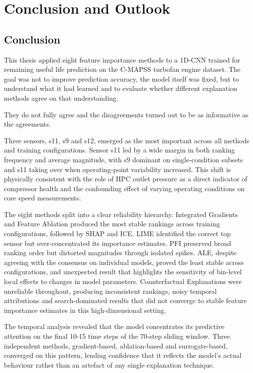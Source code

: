 \cleardoublepage

\chapter{Conclusion and Outlook}
\label{Chapter:Conclusion}

\section{Conclusion}
This thesis applied eight feature importance methods to a 1D-CNN trained for remaining useful life prediction on the C-MAPSS turbofan engine dataset. The goal was not to improve prediction accuracy, the model itself was fixed, but to understand what it had learned and to evaluate whether different explanation methods agree on that understanding. 

They do not fully agree and the disagreements turned out to be as informative as the agreements.

Three sensors, s11, s9 and s12, emerged as the most important across all methods and training configurations. Sensor s11 led by a wide margin in both ranking frequency and average magnitude, with s9 dominant on single-condition subsets and s11 taking over when operating-point variability increased. This shift is physically consistent with the role of HPC outlet pressure as a direct indicator of compressor health and the confounding effect of varying operating conditions on core speed measurements.

The eight methods split into a clear reliability hierarchy. Integrated Gradients and Feature Ablation produced the most stable rankings across training configurations, followed by SHAP and ICE. LIME identified the correct top sensor but over-concentrated its importance estimates. PFI preserved broad ranking order but distorted magnitudes through isolated spikes. ALE, despite agreeing with the consensus on individual models, proved the least stable across configurations, and unexpected result that highlights the sensitivity of bin-level local effects to changes in model parameters. Counterfactual Explanations were unreliable throughout, producing inconsistent rankings, noisy temporal attributions and search-dominated results that did not converge to stable feature importance estimates in this high-dimensional setting.

The temporal analysis revealed that the model concentrates its predictive attention on the final 10-15 time steps of the 70-step sliding window. Three independent methods, gradient-based, ablation-based and surrogate-based, converged on this pattern, lending confidence that it reflects the model's actual behaviour rather than an artefact of any single explanation technique.

